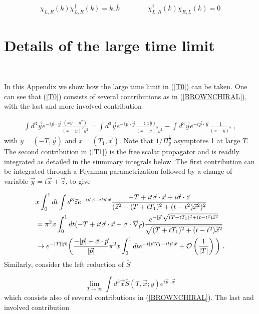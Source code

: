 \documentclass[11pt,aps,amsmath,amssymb,nofootinbib,notitlepage,longbibliography]{revtex4-1}
\newcommand{\be}{\begin{equation}}
\newcommand{\ee}{\end{equation}}
\begin{document}
\begin{eqnarray}
\chi_{L,R}(k)\chi_{L,R}^\dagger(k)=k,\overline k\qquad \qquad \chi^\dagger_{L,R}(k)\chi_{R,L}(k)=0
\end{eqnarray}



\section{Details of the large time limit}~\label{app_large}

In this Appendix we show how the large time limit in (\ref{T0}) can be taken. One can see that (\ref{T0}) consists of several contributions as in (\ref{BROWNCHIRAL}), with the last and more involved contribution

\begin{align}
\label{T1}
\int d^3\vec{y} e^{-i\vec{p}\cdot \vec{y}}\frac{(x\bar y-y^2)}{(x-y)^2y^2}=\int d^3\vec{y} e^{-i\vec{p}\cdot \vec{y}}\frac{(x\bar y)}{(x-y)^2y^2}-\int d^3\vec{y} e^{-i\vec{p}\cdot \vec{y}}\frac{1}{(x-y)^2} \ ,
\end{align}
with $y=(-T,\vec{y})$ and  $x=(T_1,\vec{x})$.  Note that  $1/\Pi_y^{\frac 12}$ asymptotes 1 at large $T$.
The second contribution in (\ref{T1}) is the  free scalar  propagator and is readily integrated as detailed in the siummary integrals  below.
The first contribution can be integrated through a Feynman parametrization followed by a change of variable
$\vec{y}=t\vec{x}+\vec{z}$,  to give

\begin{align}
\label{T2}
&x\int_{0}^1 dt\int d^3\vec{z} e^{-i\vec{p}\cdot \vec{z}-it\vec{p}\cdot \vec{x}}
\frac{-T+it\vec{\sigma}\cdot \vec{x}+i\vec{\sigma}\cdot \vec{z} }{(\vec{z}^2+(T+tT_1)^2+(t-t^2)\vec{x}^2)^2} \nonumber\\
&=\pi^2x\int_{0}^1 dt(-T+it\vec{\sigma}\cdot\vec{x}-\sigma\cdot \vec{\nabla}_{\vec{p}})\frac{e^{-|\vec{p}|\sqrt{(T+tT_1)^2+(t-t^2)\vec{x}^2}}}{\sqrt{(T+tT_1)^2+(t-t^2)\vec{x}^2}} \nonumber\\
&\rightarrow
e^{-|T||\vec{p}|}\bigg(\frac{-|\vec{p}|+\vec{\sigma}\cdot \vec{p}}{|\vec{p}|}\pi^2 x\int_{0}^{1} dt e^{-t|\vec{p}|T_1-it\vec{p}\cdot\vec{x}}+{\cal O}\left( \frac{1}{|T|}\right)\bigg) \ .
\end{align}
Similarly,  consider the left reduction of $\bar S$

\be
\lim_{T\rightarrow \infty}\int d^3\vec{x}\bar S(T,\vec{x};y)e^{i\vec{p}\cdot \vec{x}}
\ee
which consists also of several contributions in (\ref{BROWNCHIRAL}). The last and involved contribution
\end{document}
